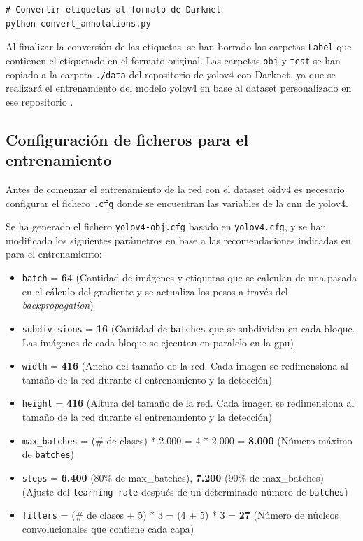 \vspace{0.5cm}
\begin{lstlisting}[language=iPython,caption=Descarga dataset Open Images Dataset v4 (3),captionpos=b,label={lst:download-oidv4_3}]
# Convertir etiquetas al formato de Darknet
python convert_annotations.py
\end{lstlisting}

Al finalizar la conversión de las etiquetas, se han borrado las carpetas \texttt{Label} que contienen el etiquetado en el formato original. Las carpetas \texttt{obj} y \texttt{test} se han copiado a la carpeta \texttt{./data} del repositorio de \gls{yolov4} con Darknet, ya que se realizará el entrenamiento del modelo \gls{yolov4} en base al dataset personalizado en ese repositorio \cite{yolov4-darknet-github}.

\subsection{Configuración de ficheros para el entrenamiento}
\label{subsec:configuracion-ficheros-training}

Antes de comenzar el entrenamiento de la red con el dataset \gls{oidv4} es necesario configurar el fichero \texttt{.cfg} donde se encuentran las variables de la \gls{cnn} de \gls{yolov4}.

Se ha generado el fichero \texttt{yolov4-obj.cfg} basado en \texttt{yolov4.cfg}, y se han modificado los siguientes parámetros en base a las recomendaciones indicadas en \cite{yolov4-darknet-github} para el entrenamiento:

\begin{itemize}
    \item \texttt{batch} = \textbf{64} (Cantidad de imágenes y etiquetas que se calculan de una pasada en el cálculo del gradiente y se actualiza los pesos a través del \textit{backpropagation})
    \item \texttt{subdivisions} = \textbf{16} (Cantidad de \texttt{batches} que se subdividen en cada bloque. Las imágenes de cada bloque se ejecutan en paralelo en la \gls{gpu})
    \item \texttt{width} = \textbf{416} (Ancho del tamaño de la red. Cada imagen se redimensiona al tamaño de la red durante el entrenamiento y la detección)
    \item \texttt{height} = \textbf{416} (Altura del tamaño de la red. Cada imagen se redimensiona al tamaño de la red durante el entrenamiento y la detección)
    \item \texttt{max\_batches} = (\# de clases) * 2.000 = 4 * 2.000 = \textbf{8.000} (Número máximo de \texttt{batches})
    \item \texttt{steps} = \textbf{6.400} (80\% de max\_batches), \textbf{7.200} (90\% de max\_batches) (Ajuste del \texttt{learning rate} después de un determinado número de \texttt{batches})
    \item \texttt{filters} = (\# de clases + 5) * 3 = (4 + 5) * 3 = \textbf{27} (Número de núcleos convolucionales que contiene cada capa)
\end{itemize}


